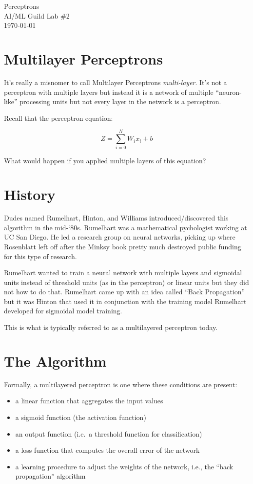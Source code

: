 \documentclass[letterpaper,12pt]{article}
\begin{document}
\begin{flushleft}
    Perceptrons\\
    AI/ML Guild Lab \#2\\
    \today \\
\end{flushleft}

\section{Multilayer Perceptrons}

It's really a misnomer to call Multilayer Perceptrons \emph{multi-layer}. It's
not a perceptron with multiple layers but instead it is a network of multiple
``neuron-like'' processing units but not every layer in the network is a
perceptron.

Recall that the perceptron equation:

\[
    Z = \sum_{i=0}^{N} W_i x_i + b
\]

What would happen if you applied multiple layers of this equation?

\section{History}

Dudes named Rumelhart, Hinton, and Williams introduced/discovered this algorithm
in the mid-‘80s. Rumelhart was a mathematical pychologist working at UC San
Diego. He led a research group on neural networks, picking up where Rosenblatt
left off after the Minksy book pretty much destroyed public funding for this
type of research.

Rumelhart wanted to train a neural network with multiple
layers and sigmoidal units instead of threshold units (as in the perceptron)
or linear units but they did not how to do that. Rumelhart came up with an idea
called ``Back Propagation'' but it was Hinton that used it in conjunction with
the training model Rumelhart developed for sigmoidal model training.

This is what is typically referred to as a multilayered perceptron today.

\section{The Algorithm}

Formally, a multilayered perceptron is one where these conditions are present:

\begin{itemize}
    \item a linear function that aggregates the input values
    \item a sigmoid function (the activation function)
    \item an output function (i.e.\ a threshold function for classification)
    \item a loss function that computes the overall error of the network
    \item a learning procedure to adjust the weights of the network, i.e., the
        ``back propagation'' algorithm
\end{itemize}
\end{document}
